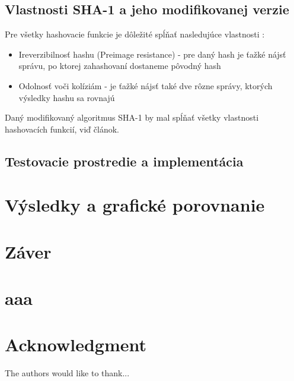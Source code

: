 \documentclass[conference]{IEEEtran}
\begin{document}
\subsection{Vlastnosti SHA-1 a jeho modifikovanej verzie}

Pre všetky hashovacie funkcie je dôležité spĺňať nasledujúce vlastnosti \cite{CHF}:

\begin{itemize}
	\item{Ireverzibilnosť hashu (Preimage resistance) - pre daný hash je ťažké nájsť správu, po ktorej zahashovaní dostaneme pôvodný hash}
	\item{Odolnosť voči kolíziám - je ťažké nájsť také dve rôzne správy, ktorých výsledky hashu sa rovnajú}
\end{itemize}

Daný modifikovaný algoritmus SHA-1 by mal spĺňať všetky vlastnosti hashovacích funkcií, viď článok\cite{MSHA}.


\subsection{Testovacie prostredie a implementácia}

\section{Výsledky a grafické porovnanie}

\section{Záver}


\appendices
\section{aaa}



\section*{Acknowledgment}


The authors would like to thank...


\ifCLASSOPTIONcaptionsoff
  \newpage
\fi
\end{document}

